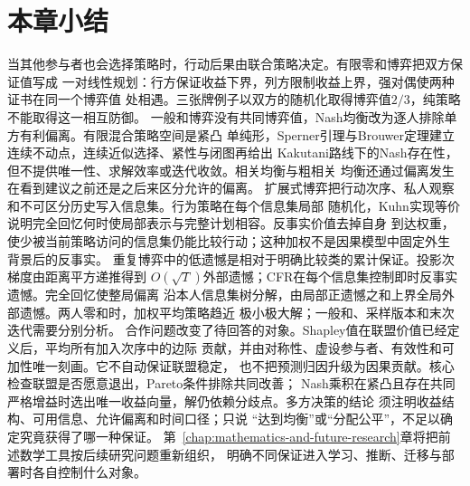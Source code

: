 \section{本章小结}
\label{sec:game-theory-and-multi-agent-decision-summary}
当其他参与者也会选择策略时，行动后果由联合策略决定。有限零和博弈把双方保证值写成
一对线性规划：行方保证收益下界，列方限制收益上界，强对偶使两种证书在同一个博弈值
处相遇。三张牌例子以双方的随机化取得博弈值\(2/3\)，纯策略不能取得这一相互防御。
一般和博弈没有共同博弈值，Nash均衡改为逐人排除单方有利偏离。有限混合策略空间是紧凸
单纯形，Sperner引理与Brouwer定理建立连续不动点，连续近似选择、紧性与闭图再给出
Kakutani路线下的Nash存在性，但不提供唯一性、求解效率或迭代收敛。相关均衡与粗相关
均衡还通过偏离发生在看到建议之前还是之后来区分允许的偏离。
扩展式博弈把行动次序、私人观察和不可区分历史写入信息集。行为策略在每个信息集局部
随机化，Kuhn实现等价说明完全回忆何时使局部表示与完整计划相容。反事实价值去掉自身
到达权重，使少被当前策略访问的信息集仍能比较行动；这种加权不是因果模型中固定外生
背景后的反事实。
重复博弈中的低遗憾是相对于明确比较类的累计保证。投影次梯度由距离平方递推得到
\(O(\sqrt{T})\)外部遗憾；CFR在每个信息集控制即时反事实遗憾。完全回忆使整局偏离
沿本人信息集树分解，由局部正遗憾之和上界全局外部遗憾。两人零和时，加权平均策略趋近
极小极大解；一般和、采样版本和末次迭代需要分别分析。
合作问题改变了待回答的对象。Shapley值在联盟价值已经定义后，平均所有加入次序中的边际
贡献，并由对称性、虚设参与者、有效性和可加性唯一刻画。它不自动保证联盟稳定，
也不把预测归因升级为因果贡献。核心检查联盟是否愿意退出，Pareto条件排除共同改善；
Nash乘积在紧凸且存在共同严格增益时选出唯一收益向量，解仍依赖分歧点。多方决策的结论
须注明收益结构、可用信息、允许偏离和时间口径；只说
“达到均衡”或“分配公平”，不足以确定究竟获得了哪一种保证。
第~\ref{chap:mathematics-and-future-research}章将把前述数学工具按后续研究问题重新组织，
明确不同保证进入学习、推断、迁移与部署时各自控制什么对象。
